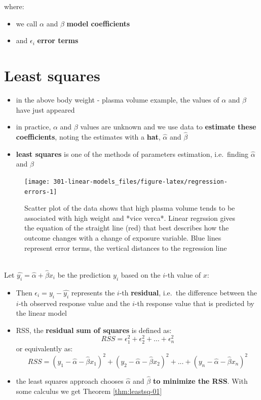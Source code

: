 \documentclass[
]{book}
\providecommand{\tightlist}{%
  \setlength{\itemsep}{0pt}\setlength{\parskip}{0pt}}
\theoremstyle{definition}
\theoremstyle{definition}
\theoremstyle{definition}
\theoremstyle{remark}
\begin{document}
where:

\begin{itemize}
\tightlist
\item
  we call \(\alpha\) and \(\beta\) \textbf{model coefficients}
\item
  and \(\epsilon_i\) \textbf{error terms}
\end{itemize}

\hypertarget{least-squares}{%
\section{Least squares}\label{least-squares}}

\begin{itemize}
\tightlist
\item
  in the above body weight - plasma volume example, the values of \(\alpha\) and \(\beta\) have just appeared
\item
  in practice, \(\alpha\) and \(\beta\) values are unknown and we use data to \textbf{estimate these coefficients}, noting the estimates with a \textbf{hat}, \(\hat{\alpha}\) and \(\hat{\beta}\)
\item
  \textbf{least squares} is one of the methods of parameters estimation, i.e.~finding \(\hat{\alpha}\) and \(\hat{\beta}\)
\end{itemize}

\begin{figure}

{\centering \texttt{[image: 301-linear-models\_files/figure-latex/regression-errors-1]} 

}

\caption{Scatter plot of the data shows that high plasma volume tends to be associated with high weight and *vice verca*. Linear regrssion gives the equation of the straight line (red) that best describes how the outcome changes with a change of exposure variable. Blue lines represent error terms, the vertical distances to the regression line}\label{fig:regression-errors}
\end{figure}

~\\
Let \(\hat{y_i}=\hat{\alpha} + \hat{\beta}x_i\) be the prediction \(y_i\) based on the \(i\)-th value of \(x\):

\begin{itemize}
\tightlist
\item
  Then \(\epsilon_i = y_i - \hat{y_i}\) represents the \(i\)-th \textbf{residual}, i.e.~the difference between the \(i\)-th observed response value and the \(i\)-th response value that is predicted by the linear model
\item
  RSS, the \textbf{residual sum of squares} is defined as: \[RSS = \epsilon_1^2 + \epsilon_2^2 + \dots + \epsilon_n^2\] or
  equivalently as: \[RSS=(y_1-\hat{\alpha}-\hat{\beta}x_1)^2+(y_2-\hat{\alpha}-\hat{\beta}x_2)^2+...+(y_n-\hat{\alpha}-\hat{\beta}x_n)^2\]
\item
  the least squares approach chooses \(\hat{\alpha}\) and \(\hat{\beta}\) \textbf{to minimize the RSS}. With some calculus we get Theorem \ref{thm:leastsq-01}
\end{itemize}
\end{document}

